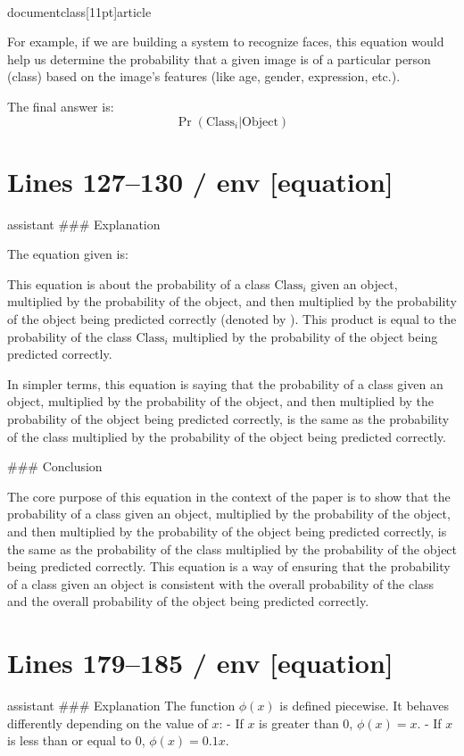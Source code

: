 \\documentclass[11pt]{article}
\begin{document}
For example, if we are building a system to recognize faces, this equation would help us determine the probability that a given image is of a particular person (class) based on the image's features (like age, gender, expression, etc.).

The final answer is:
\[
\boxed{\Pr(\textrm{Class}_i | \textrm{Object})}
\]


\section*{Lines 127–130 / env [equation]}
assistant
### Explanation

The equation given is:

This equation is about the probability of a class \( \textrm{Class}_i \) given an object, multiplied by the probability of the object, and then multiplied by the probability of the object being predicted correctly (denoted by ). This product is equal to the probability of the class \( \textrm{Class}_i \) multiplied by the probability of the object being predicted correctly.

In simpler terms, this equation is saying that the probability of a class given an object, multiplied by the probability of the object, and then multiplied by the probability of the object being predicted correctly, is the same as the probability of the class multiplied by the probability of the object being predicted correctly.

### Conclusion

The core purpose of this equation in the context of the paper is to show that the probability of a class given an object, multiplied by the probability of the object, and then multiplied by the probability of the object being predicted correctly, is the same as the probability of the class multiplied by the probability of the object being predicted correctly. This equation is a way of ensuring that the probability of a class given an object is consistent with the overall probability of the class and the overall probability of the object being predicted correctly.


\section*{Lines 179–185 / env [equation]}
assistant
### Explanation
The function \(\phi(x)\) is defined piecewise. It behaves differently depending on the value of \(x\):
- If \(x\) is greater than 0, \(\phi(x) = x\).
- If \(x\) is less than or equal to 0, \(\phi(x) = 0.1x\).
\end{document}
